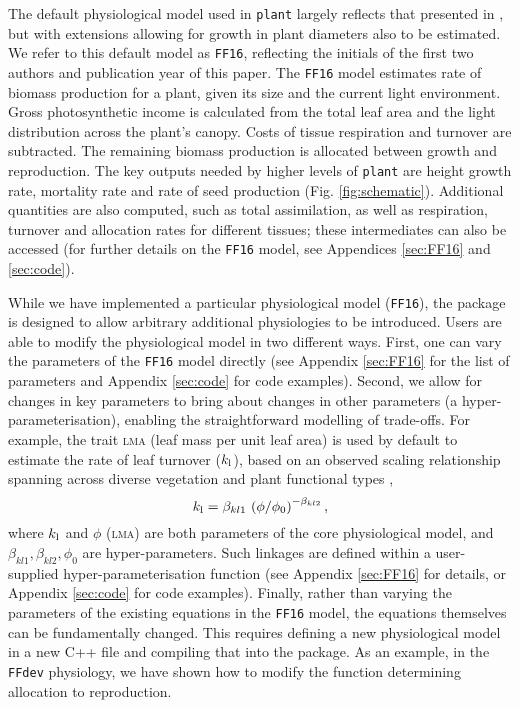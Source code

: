 \documentclass[a4paper,11pt]{article}
\newcommand{\plant}{\texttt{plant}}
\begin{document}
The default physiological model used in {\plant} largely reflects
that presented in \citet{Falster-2011, Falster-2015}, but with extensions
allowing for growth in plant diameters also to be estimated. We refer to this
default model as \texttt{FF16}, reflecting the initials of the first two authors
and publication year of this paper. The \texttt{FF16} model estimates rate
of biomass
production for a plant, given its size and the current light
environment. Gross photosynthetic income is calculated from the total
leaf area and the light distribution across the plant's canopy. Costs
of tissue respiration and turnover are subtracted. The remaining
biomass production is allocated between growth and reproduction. The key
outputs needed by higher levels of {\plant} are height
growth rate, mortality rate and rate of seed production (Fig. \ref{fig:schematic}). Additional quantities are also computed, such as total assimilation, as well as
respiration, turnover and allocation rates for different
tissues; these intermediates can also be accessed (for further details on the \texttt{FF16} model, see Appendices
\ref{sec:FF16} and \ref{sec:code}).

While we have implemented a particular physiological model
(\texttt{FF16}), the package is designed to allow arbitrary
additional physiologies to be introduced. Users are able to modify the
physiological model in two different ways. First, one can vary the
parameters of the \texttt{FF16} model directly (see Appendix
\ref{sec:FF16} for the list of parameters and Appendix \ref{sec:code} for code
examples). Second, we allow for changes in key parameters to bring
about changes in other parameters (a hyper-parameterisation), enabling the
straightforward modelling of trade-offs. For example, the
trait \textsc{lma} (leaf mass per unit leaf area) is used by default to estimate
the rate of leaf turnover ($k_{\rm l}$), based on an observed scaling
relationship spanning across diverse vegetation and plant functional
types \citep{Wright-2004},
$$k_{\rm l} = \beta_{kl1} \, \left(\phi / \phi_0\right)^{-\beta_{kl2}},$$
where $k_{\rm l}$ and $\phi$ (\textsc{lma}) are both parameters of the core physiological
model, and $\beta_{kl1}, \beta_{kl2}, \phi_0$ are hyper-parameters. Such
linkages are defined within a user-supplied hyper-parameterisation function
(see Appendix \ref{sec:FF16} for details, or Appendix
\ref{sec:code} for code examples).
%
Finally, rather than varying the parameters of the existing equations
in the \texttt{FF16} model, the equations themselves can be
fundamentally changed. This requires defining a new physiological
model in a new C++ file and compiling that into the package. As an
example, in the \texttt{FFdev} physiology, we have shown how to modify the
function determining allocation to reproduction.
\end{document}

